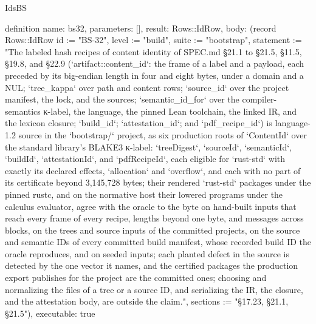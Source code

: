 \begin{lexlean}{IdsBS}
\begin{semanticmodule}
definition{
  name: bs32,
  parameters: [],
  result: Rows::IdRow,
  body: (record Rows::IdRow {id := "BS-32", level := "build", suite := "bootstrap", statement := "The labeled hash recipes of content identity of SPEC.md §21.1 to §21.5, §11.5, §19.8, and §22.9 (`artifact::content_id`: the frame of a label and a payload, each preceded by its big-endian length in four and eight bytes, under a domain and a NUL; `tree_kappa` over path and content rows; `source_id` over the project manifest, the lock, and the sources; `semantic_id_for` over the compiler-semantics κ-label, the language, the pinned Lean toolchain, the linked IR, and the lexicon closure; `build_id`; `attestation_id`; and `pdf_recipe_id`) is language-1.2 source in the `bootstrap/` project, as six production roots of `ContentId` over the standard library's BLAKE3 κ-label: `treeDigest`, `sourceId`, `semanticId`, `buildId`, `attestationId`, and `pdfRecipeId`, each eligible for `rust-std` with exactly its declared effects, `allocation` and `overflow`, and each with no part of its certificate beyond 3,145,728 bytes; their rendered `rust-std` packages under the pinned rustc, and on the normative host their lowered programs under the calculus evaluator, agree with the oracle to the byte on hand-built inputs that reach every frame of every recipe, lengths beyond one byte, and messages across blocks, on the trees and source inputs of the committed projects, on the source and semantic IDs of every committed build manifest, whose recorded build ID the oracle reproduces, and on seeded inputs; each planted defect in the source is detected by the one vector it names, and the certified packages the production export publishes for the project are the committed ones; choosing and normalizing the files of a tree or a source ID, and serializing the IR, the closure, and the attestation body, are outside the claim.", sections := "§17.23, §21.1, §21.5"}),
  executable: true
}


\end{semanticmodule}
\end{lexlean}
